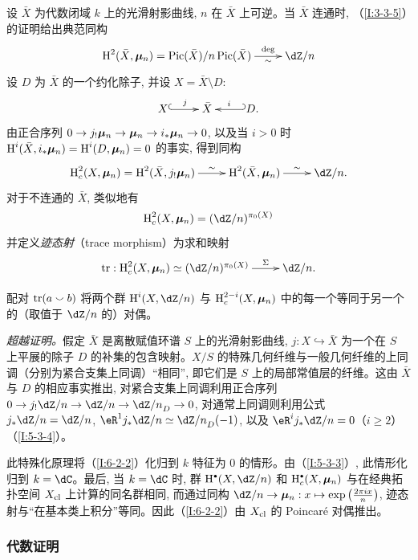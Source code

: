 \subsubsection{}\label{I:6-2-1}

设 $\bar X$ 为代数闭域 $k$ 上的光滑射影曲线, $n$ 在 $\bar X$ 上可逆。当 $\bar X$ 连通时, （\ref{I:3-3-5}）的证明给出典范同构
\[\xymatrix{
  \h^2(\bar X,\dmu_n) = \pic(\bar X)/n\pic(\bar X) \ar[r]^-{\deg}_-{\sim}
    & \dZ/n
}\]
设 $D$ 为 $\bar X$ 的一个约化除子, 并设 $X=\bar X\setminus D$:
\[\xymatrix{
  X \ar@{^{(}->}[r]^-j
    & \bar X
    & \ar@{_{(}->}[l]_-i D \text{.}
}\]
由正合序列 $0\to j_!{\bm\mu}_n\to{\bm\mu}_n\to i_*{\bm\mu}_n\to0$, 以及当 $i>0$ 时 $\operatorname{H}^i(\bar X,i_*{\bm\mu}_n)=\operatorname{H}^i(D,{\bm\mu}_n)=0$ 的事实, 得到同构
\[\xymatrix{
  \h_c^2(X,\dmu_n) = \h^2(\bar X,j_! \dmu_n) \ar[r]^-\sim
    & \h^2(\bar X,\dmu_n) \ar[r]^-\sim
    & \dZ/n \text{.}
}\]
对于不连通的 $\bar X$, 类似地有
\[
  \h_c^2(X,\dmu_n) = (\dZ/n)^{\pi_0(X)}
\]
并定义\emph{迹态射}（trace morphism）为求和映射
\[\xymatrix{
  \tr : \h_c^2(X,\dmu_n) \simeq (\dZ/n)^{\pi_0(X)} \ar[r]^-\Sigma
    & \dZ/n\text{.}
}\]

\begin{theorem}\label{I:6-2-2}
配对 $\operatorname{tr}(a\smallsmile b)$ 将两个群 $\h^i(X,\dZ/n)$ 与 $\operatorname{H}_c^{2-i}(X,{\bm\mu}_n)$ 中的每一个等同于另一个的（取值于 $\dZ/n$ 的）对偶。
\end{theorem}

\emph{超越证明。}假定 $\bar X$ 是离散赋值环谱 $S$ 上的光滑射影曲线, $j:X\hookrightarrow\bar X$ 为一个在 $S$ 上平展的除子 $D$ 的补集的包含映射。$X/S$ 的特殊几何纤维与一般几何纤维的上同调（分别为紧合支集上同调）“相同”, 即它们是 $S$ 上的局部常值层的纤维。这由 $\bar X$ 与 $D$ 的相应事实推出, 对紧合支集上同调利用正合序列 $0\to j_!\dZ/n\to\dZ/n\to{\dZ/n}_D\to0$, 对通常上同调则利用公式 $j_*\dZ/n=\dZ/n$, $\eR^1j_*\dZ/n\simeq{\dZ/n}_D(-1)$, 以及 $\eR^ij_*\dZ/n=0$（$i\geqslant2$）（\ref{I:5-3-4}）。

此特殊化原理将（\ref{I:6-2-2}）化归到 $k$ 特征为 $0$ 的情形。由（\ref{I:5-3-3}）, 此情形化归到 $k=\dC$。最后, 当 $k=\dC$ 时, 群 $\h^\bullet(X,\dZ/n)$ 和 $\h_c^\bullet(X,\dmu_n)$ 与在经典拓扑空间 $X_{\textnormal{cl}}$ 上计算的同名群相同, 而通过同构 $\dZ/n\to\dmu_n:x\mapsto\exp\left(\frac{2\pi ix}{n}\right)$, 迹态射与“在基本类上积分”等同。因此（\ref{I:6-2-2}）由 $X_{\textnormal{cl}}$ 的 Poincaré 对偶推出。

\subsubsection{代数证明}\label{I:6-2-3}

